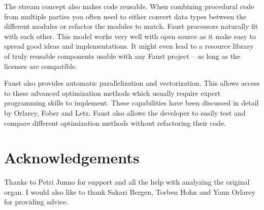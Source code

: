 \documentclass[11pt,a4paper]{article}
\begin{document}
The stream concept also makes code reusable. When combining procedural code from multiple parties you often need to either convert data types between the different modules or refactor the modules to match. Faust processors naturally fit with each other. This model works very well with open source as it make easy to spread good ideas and implementations. It might even lead to a resource library of truly reusable components usable with any Faust project -- as long as the licenses are compatible.

Faust also provides automatic parallelization and vectorization. This allows access to these advanced optimization methods which usually require expert programming skills to implement. These capabilities have been discussed in detail by Orlarey, Fober and Letz\cite{orlarey:09a}. Faust also allows the developer to easily test and compare different optimization methods without refactoring their code.

\section{Acknowledgements}

Thanks to Petri Junno for support and all the help with analyzing the original organ. I would also like to thank Sakari Bergen, Torben Hohn and Yann Orlarey for providing advice.



\end{document}
